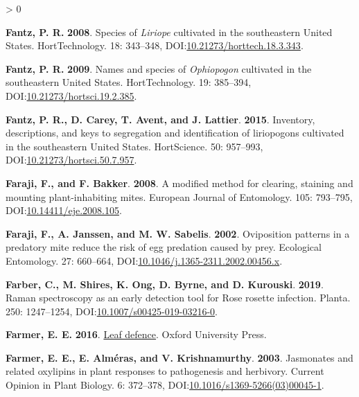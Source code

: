 \documentclass{ufdissertation}[overrideChapters] %
\newlength{\cslhangindent}
\newenvironment{CSLReferences}[2] %
 {%
  \setlength{\parindent}{0pt}
  \ifodd #1 \everypar{\setlength{\hangindent}{\cslhangindent}}\ignorespaces\fi
  \ifnum #2 > 0
  \setlength{\parskip}{#2\baselineskip}
  \fi
 }%
 {}
\begin{document}
{\begin{CSLReferences}{1}{1}
\leavevmode{}%
\textbf{Fantz, P. R.} \textbf{2008}. Species of {\emph{Liriope}} cultivated in the southeastern {United States}. {HortTechnology}. 18: 343--348, DOI:\href{https://doi.org/10.21273/horttech.18.3.343}{10.21273/horttech.18.3.343}.

\leavevmode{}%
\textbf{Fantz, P. R.} \textbf{2009}. Names and species of {\emph{Ophiopogon}} cultivated in the southeastern {United States}. {HortTechnology}. 19: 385--394, DOI:\href{https://doi.org/10.21273/hortsci.19.2.385}{10.21273/hortsci.19.2.385}.

\leavevmode{}%
\textbf{Fantz, P. R., D. Carey, T. Avent, and J. Lattier}. \textbf{2015}. Inventory, descriptions, and keys to segregation and identification of liriopogons cultivated in the southeastern {United States}. {HortScience}. 50: 957--993, DOI:\href{https://doi.org/10.21273/hortsci.50.7.957}{10.21273/hortsci.50.7.957}.

\leavevmode{}%
\textbf{Faraji, F., and F. Bakker}. \textbf{2008}. A modified method for clearing, staining and mounting plant-inhabiting mites. European Journal of Entomology. 105: 793--795, DOI:\href{https://doi.org/10.14411/eje.2008.105}{10.14411/eje.2008.105}.

\leavevmode{}%
\textbf{Faraji, F., A. Janssen, and M. W. Sabelis}. \textbf{2002}. Oviposition patterns in a predatory mite reduce the risk of egg predation caused by prey. Ecological Entomology. 27: 660--664, DOI:\href{https://doi.org/10.1046/j.1365-2311.2002.00456.x}{10.1046/j.1365-2311.2002.00456.x}.

\leavevmode{}%
\textbf{Farber, C., M. Shires, K. Ong, D. Byrne, and D. Kurouski}. \textbf{2019}. {Raman} spectroscopy as an early detection tool for {Rose rosette} infection. Planta. 250: 1247--1254, DOI:\href{https://doi.org/10.1007/s00425-019-03216-0}{10.1007/s00425-019-03216-0}.

\leavevmode{}%
\textbf{Farmer, E. E.} \textbf{2016}. \href{https://www.ebook.de/de/product/28782938/edward_e_farmer_leaf_defence.html}{Leaf defence}. Oxford University Press.

\leavevmode{}%
\textbf{Farmer, E. E., E. Alméras, and V. Krishnamurthy}. \textbf{2003}. Jasmonates and related oxylipins in plant responses to pathogenesis and herbivory. Current Opinion in Plant Biology. 6: 372--378, DOI:\href{https://doi.org/10.1016/s1369-5266(03)00045-1}{10.1016/s1369-5266(03)00045-1}.


\end{CSLReferences}}
\end{document}
